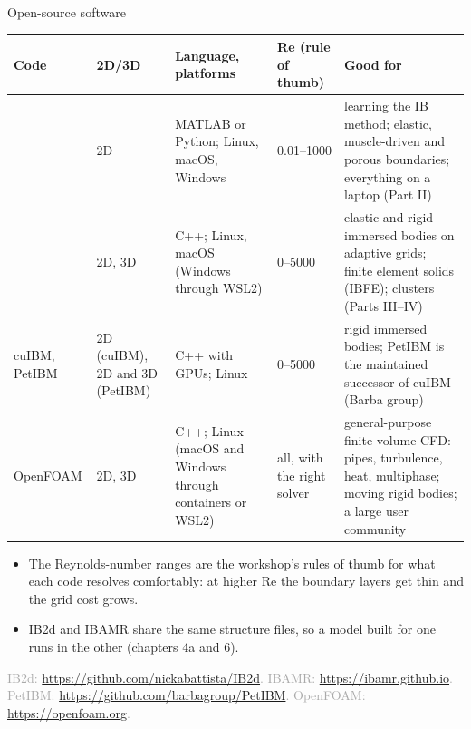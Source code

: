 \documentclass[aspectratio=169,11pt]{beamer}
\newcommand{\sourcecredit}[1]{\vfill\hfill{\tiny\textcolor{DarkGray}{#1}}}
\begin{document}
\begin{frame}{Open-source software}
\scriptsize
\begin{tabular}{@{}L{0.12\textwidth}L{0.1\textwidth}L{0.15\textwidth}L{0.11\textwidth}L{0.4\textwidth}@{}}
\toprule
Code & 2D/3D & Language, platforms & Re (rule of thumb) & Good for\\
\midrule
{} & 2D & MATLAB or Python; Linux, macOS, Windows & 0.01--1000 & learning the IB method; elastic, muscle-driven and porous boundaries; everything on a laptop (Part II)\\
 & 2D, 3D & C++; Linux, macOS (Windows through WSL2) & 0--5000 & elastic and rigid immersed bodies on adaptive grids; finite element solids (IBFE); clusters (Parts III--IV)\\
cuIBM, PetIBM & 2D (cuIBM), 2D and 3D (PetIBM) & C++ with GPUs; Linux & 0--5000 & rigid immersed bodies; PetIBM is the maintained successor of cuIBM (Barba group)\\
OpenFOAM & 2D, 3D & C++; Linux (macOS and Windows through containers or WSL2) & all, with the right solver & general-purpose finite volume CFD: pipes, turbulence, heat, multiphase; moving rigid bodies; a large user community\\
\bottomrule
\end{tabular}
\vspace{2mm}
\begin{itemize}
  \item The Reynolds-number ranges are the workshop's rules of thumb for what each code resolves comfortably: at higher Re the boundary layers get thin and the grid cost grows.
  \item IB2d and IBAMR share the same structure files, so a model built for one runs in the other (chapters 4a and 6).
\end{itemize}
\sourcecredit{IB2d: \url{https://github.com/nickabattista/IB2d}. IBAMR: \url{https://ibamr.github.io}. PetIBM: \url{https://github.com/barbagroup/PetIBM}. OpenFOAM: \url{https://openfoam.org}.}
\end{frame}
\end{document}

